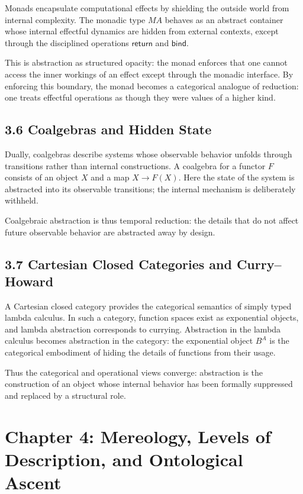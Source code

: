 \documentclass[12pt,letterpaper]{article}
\theoremstyle{remark}
\begin{document}
Monads encapsulate computational effects by shielding the outside world from internal complexity. The monadic type \(M A\) behaves as an abstract container whose internal effectful dynamics are hidden from external contexts, except through the disciplined operations \(\mathsf{return}\) and \(\mathsf{bind}\).

This is abstraction as structured opacity: the monad enforces that one cannot access the inner workings of an effect except through the monadic interface. By enforcing this boundary, the monad becomes a categorical analogue of reduction: one treats effectful operations as though they were values of a higher kind.

\subsection{3.6 Coalgebras and Hidden State}

Dually, coalgebras describe systems whose observable behavior unfolds through transitions rather than internal constructions. A coalgebra for a functor \(F\) consists of an object \(X\) and a map \(X \to F(X)\). Here the state of the system is abstracted into its observable transitions; the internal mechanism is deliberately withheld.

Coalgebraic abstraction is thus temporal reduction: the details that do not affect future observable behavior are abstracted away by design.

\subsection{3.7 Cartesian Closed Categories and Curry--Howard}

A Cartesian closed category provides the categorical semantics of simply typed lambda calculus. In such a category, function spaces exist as exponential objects, and lambda abstraction corresponds to currying. Abstraction in the lambda calculus becomes abstraction in the category: the exponential object \(B^A\) is the categorical embodiment of hiding the details of functions from their usage.

Thus the categorical and operational views converge: abstraction is the construction of an object whose internal behavior has been formally suppressed and replaced by a structural role.

\newpage

\section{Chapter 4: Mereology, Levels of Description, and Ontological Ascent}
\end{document}
